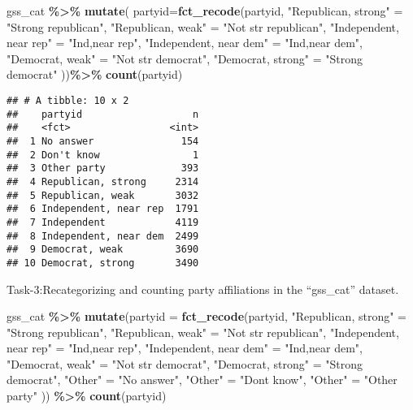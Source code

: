 \documentclass[
]{article}
\newenvironment{Shaded}{\begin{snugshade}}{\end{snugshade}}
\newcommand{\AttributeTok}[1]{\textcolor[rgb]{0.13,0.29,0.53}{#1}}
\newcommand{\FunctionTok}[1]{\textcolor[rgb]{0.13,0.29,0.53}{\textbf{#1}}}
\newcommand{\NormalTok}[1]{#1}
\newcommand{\OtherTok}[1]{\textcolor[rgb]{0.56,0.35,0.01}{#1}}
\newcommand{\SpecialCharTok}[1]{\textcolor[rgb]{0.81,0.36,0.00}{\textbf{#1}}}
\newcommand{\StringTok}[1]{\textcolor[rgb]{0.31,0.60,0.02}{#1}}
\begin{document}
\begin{Shaded}
\begin{Highlighting}[]
\NormalTok{gss\_cat }\SpecialCharTok{\%\textgreater{}\%}
  \FunctionTok{mutate}\NormalTok{( }\AttributeTok{partyid=}\FunctionTok{fct\_recode}\NormalTok{(partyid,}
    \StringTok{"Republican, strong"}    \OtherTok{=} \StringTok{"Strong republican"}\NormalTok{,}
    \StringTok{"Republican, weak"}      \OtherTok{=} \StringTok{"Not str republican"}\NormalTok{,}
    \StringTok{"Independent, near rep"} \OtherTok{=} \StringTok{"Ind,near rep"}\NormalTok{,}
    \StringTok{"Independent, near dem"} \OtherTok{=} \StringTok{"Ind,near dem"}\NormalTok{,}
    \StringTok{"Democrat, weak"}        \OtherTok{=} \StringTok{"Not str democrat"}\NormalTok{,}
    \StringTok{"Democrat, strong"}      \OtherTok{=} \StringTok{"Strong democrat"}
\NormalTok{    ))}\SpecialCharTok{\%\textgreater{}\%}
  \FunctionTok{count}\NormalTok{(partyid)}
\end{Highlighting}
\end{Shaded}

\begin{verbatim}
## # A tibble: 10 x 2
##    partyid                   n
##    <fct>                 <int>
##  1 No answer               154
##  2 Don't know                1
##  3 Other party             393
##  4 Republican, strong     2314
##  5 Republican, weak       3032
##  6 Independent, near rep  1791
##  7 Independent            4119
##  8 Independent, near dem  2499
##  9 Democrat, weak         3690
## 10 Democrat, strong       3490
\end{verbatim}

Task-3:Recategorizing and counting party affiliations in the
``gss\_cat'' dataset.

\begin{Shaded}
\begin{Highlighting}[]
\NormalTok{gss\_cat }\SpecialCharTok{\%\textgreater{}\%}
  \FunctionTok{mutate}\NormalTok{(}\AttributeTok{partyid =} \FunctionTok{fct\_recode}\NormalTok{(partyid,}
    \StringTok{"Republican, strong"}    \OtherTok{=} \StringTok{"Strong republican"}\NormalTok{,}
    \StringTok{"Republican, weak"}      \OtherTok{=} \StringTok{"Not str republican"}\NormalTok{,}
    \StringTok{"Independent, near rep"} \OtherTok{=} \StringTok{"Ind,near rep"}\NormalTok{,}
    \StringTok{"Independent, near dem"} \OtherTok{=} \StringTok{"Ind,near dem"}\NormalTok{,}
    \StringTok{"Democrat, weak"}        \OtherTok{=} \StringTok{"Not str democrat"}\NormalTok{,}
    \StringTok{"Democrat, strong"}      \OtherTok{=} \StringTok{"Strong democrat"}\NormalTok{,}
    \StringTok{"Other"}                 \OtherTok{=} \StringTok{"No answer"}\NormalTok{,}
    \StringTok{"Other"}                 \OtherTok{=} \StringTok{"Don\textquotesingle{}t know"}\NormalTok{,}
    \StringTok{"Other"}                 \OtherTok{=} \StringTok{"Other party"}
\NormalTok{  )) }\SpecialCharTok{\%\textgreater{}\%}
  \FunctionTok{count}\NormalTok{(partyid)}
\end{Highlighting}
\end{Shaded}
\end{document}
